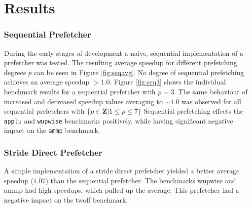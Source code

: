 \section{Results}
\label{sec:results}
%
\subsubsection{Sequential Prefetcher}
During the early stages of development a naive, sequential implementation of a prefetcher was tested.
The resulting average speedup for different prefetching degrees $p$ can be seen in Figure \ref{fig:seqavg}.
No degree of sequential prefetching achieves an average speedup $> 1.0$.
Figure \ref{fig:seq3} shows the individual benchmark results for a sequential prefetcher with $p = 3$.
The same behaviour of increased and decreased speedup values averaging to $\sim 1.0$ was observed for all sequential prefetchers with $\{p \in \mathbf{Z} | 1 \leq p \leq 7\}$
Sequential prefetching effects the \texttt{applu} and \texttt{wupwise} benchmarks positively, while having significant negative impact on the \texttt{ammp} benchmark.

\begin{figure*}
    
    \caption{Average speedup as a function of degree for the sequential prefetcher.}
    \label{fig:seqavg}
\end{figure*}

\begin{figure*}
\label{fig:seq3}

\caption{Performance of sequential prefetcher with $p = 3$ across benchmarks.}
\end{figure*}

\subsubsection{Stride Direct Prefetcher}
A simple implementation of a stride direct prefetcher yielded a better average speedup ($1.07$) than the sequential prefetcher.
The benchmarks wupwise and ammp had high speedups, which pulled up the average.
This prefetcher had a negative impact on the twolf benchmark.

